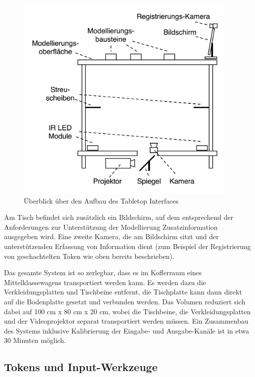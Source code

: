 \begin{figure}[htbp]
	\centering
		\includegraphics[height=4in]{img/ImplementierungInput/TischSeitenansicht.png}
	\caption{Überblick über den Aufbau des Tabletop Interfaces}
	\label{fig:img_ImplementierungInput_TischSeitenansicht}
\end{figure}

Am Tisch befindet sich zusätzlich ein Bildschirm, auf dem entsprechend der Anforderungen zur Unterstützung der Modellierung Zusatzinformation ausgegeben wird. Eine zweite Kamera, die am Bildschirm sitzt und der unterstützenden Erfassung von Information dient (zum Beispiel der Registrierung von geschachtelten Token wie oben bereits beschrieben).

Das gesamte System ist so zerlegbar, dass es im Kofferraum eines Mittelklassewagens transportiert werden kann. Es werden dazu die Verkleidungsplatten und Tischbeine entfernt, die Tischplatte kann dann direkt auf die Bodenplatte gesetzt und verbunden werden. Das Volumen reduziert sich dabei auf 100 cm x 80 cm x 20 cm, wobei die Tischbeine, die Verkleidungsplatten und der Videoprojektor separat transportiert werden müssen. Ein Zusammenbau des Systems inklusive Kalibrierung der Eingabe- und Ausgabe-Kanäle ist in etwa 30 Minuten möglich.


\subsection{Tokens und Input-Werkzeuge} %
\label{sub:tokens_&_input_werkzeuge}


